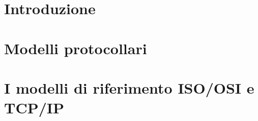 \documentclass[12 pt]{article}
\begin{document}
\newgeometry{}

\tableofcontents
\restoregeometry

\section{Introduzione}


\section{Modelli protocollari}


\section{I modelli di riferimento ISO/OSI e TCP/IP}

\end{document}

